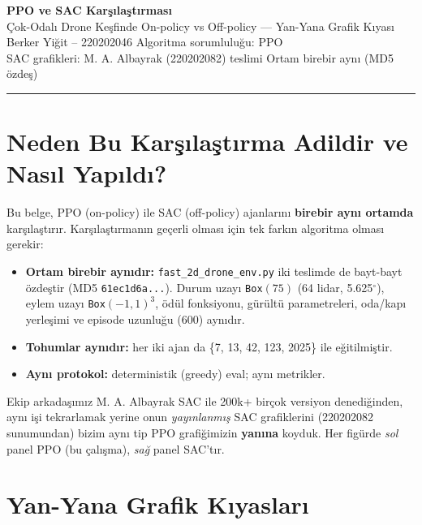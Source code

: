 \documentclass[11pt,a4paper]{article}
\newcommand{\reff}[1]{\texttt{#1}}
\begin{document}
\begin{center}
{\Large\bfseries PPO ve SAC Karşılaştırması}\\[0.3em]
{\large Çok-Odalı Drone Keşfinde On-policy vs Off-policy — Yan-Yana Grafik Kıyası}\\[0.6em]
{\normalsize Berker Yiğit -- 220202046 \quad\textbar\quad Algoritma sorumluluğu: PPO}\\
{\small SAC grafikleri: M. A. Albayrak (220202082) teslimi \quad\textbar\quad Ortam birebir aynı (MD5 özdeş)}
\end{center}
\hrule\vspace{0.5em}

\section{Neden Bu Karşılaştırma Adildir ve Nasıl Yapıldı?}
Bu belge, PPO (on-policy) ile SAC (off-policy) ajanlarını \textbf{birebir aynı ortamda}
karşılaştırır. Karşılaştırmanın geçerli olması için tek farkın algoritma olması gerekir:
\begin{itemize}
\item \textbf{Ortam birebir aynıdır:} \reff{fast\_2d\_drone\_env.py} iki teslimde de
bayt-bayt özdeştir (MD5 \reff{61ec1d6a...}). Durum uzayı \reff{Box}$(75)$ (64 lidar,
5.625$^\circ$), eylem uzayı \reff{Box}$(-1,1)^3$, ödül fonksiyonu, gürültü parametreleri,
oda/kapı yerleşimi ve episode uzunluğu (600) aynıdır.
\item \textbf{Tohumlar aynıdır:} her iki ajan da \{7, 13, 42, 123, 2025\} ile eğitilmiştir.
\item \textbf{Aynı protokol:} deterministik (greedy) eval; aynı metrikler.
\end{itemize}
Ekip arkadaşımız M. A. Albayrak SAC ile 200k+ birçok versiyon denediğinden, aynı işi
tekrarlamak yerine onun \emph{yayınlanmış} SAC grafiklerini (220202082 sunumundan)
bizim aynı tip PPO grafiğimizin \textbf{yanına} koyduk. Her figürde \emph{sol} panel PPO
(bu çalışma), \emph{sağ} panel SAC'tır.

\begin{table}[h]\centering\small
\caption{PPO ve SAC ortalama sonuçları (her sütun ilgili teslimin yayınlanmış değeri).}
\end{table}

\section{Yan-Yana Grafik Kıyasları}
\end{document}
